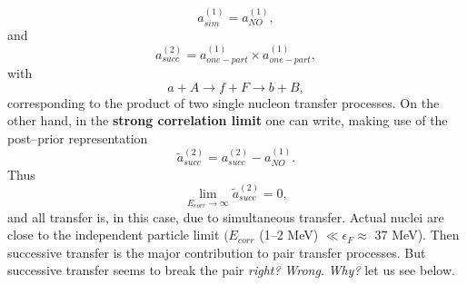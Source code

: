 \begin{equation}
a_{sim}^{(1)}=a_{NO}^{(1)},
\end{equation}
and
\begin{equation}
a_{succ}^{(2)}=a_{one-part}^{(1)}\times a_{one-part}^{(1)},
\end{equation}
\vspace{0.2cm}
with
\begin{equation}
a+A\rightarrow f+F \rightarrow b+B,
\end{equation}         
corresponding to the product of two single nucleon transfer processes.
On the other hand, in the \textbf{strong correlation limit} one can write, making use of the
post--prior representation
\begin{equation}
\tilde a_{succ}^{(2)}= a_{succ}^{(2)}-a_{NO}^{(1)}.
\end{equation}
Thus
\begin{equation}
\lim_{E_{corr}\rightarrow \infty} \tilde a_{succ}^{(2)}=0,
\end{equation}
and all transfer is, in this case, due to simultaneous transfer.
Actual nuclei are close to the independent particle limit $(E_{corr}$ (1--2 MeV) $\ll \epsilon_F\approx$ 37 MeV). Then successive transfer is the major contribution to pair transfer processes. But successive transfer seems to break the pair \textit{right?} \textit{Wrong}. \textit{Why?} let us see below.

